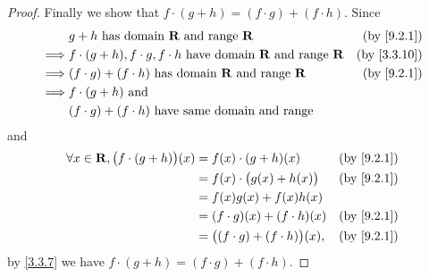 \begin{proof}
  Finally we show that \(f \cdot (g + h) = (f \cdot g) + (f \cdot h)\).
  Since
  \begin{align*}
             & g + h \text{ has domain } \R \text{ and range } \R                                   & \text{(by \cref{9.2.1})}  \\
    \implies & f \cdot (g + h), f \cdot g, f \cdot h  \text{ have domain } \R \text{ and range } \R & \text{(by \cref{3.3.10})} \\
    \implies & (f \cdot g) + (f \cdot h)  \text{ has domain } \R \text{ and range } \R              & \text{(by \cref{9.2.1})}  \\
    \implies & f \cdot (g + h) \text{ and }                                                                                     \\
             & (f \cdot g) + (f \cdot h) \text{ have same domain and range}
  \end{align*}
  and
  \begin{align*}
    \forall x \in \R, \big(f \cdot (g + h)\big)(x) & = f(x) \cdot (g + h)(x)                   & \text{(by \cref{9.2.1})} \\
                                                   & = f(x) \cdot \big(g(x) + h(x)\big)        & \text{(by \cref{9.2.1})} \\
                                                   & = f(x)g(x) + f(x)h(x)                                                \\
                                                   & = (f \cdot g)(x) + (f \cdot h)(x)         & \text{(by \cref{9.2.1})} \\
                                                   & = \big((f \cdot g) + (f \cdot h)\big)(x), & \text{(by \cref{9.2.1})}
  \end{align*}
  by \cref{3.3.7} we have \(f \cdot (g + h) = (f \cdot g) + (f \cdot h)\).
\end{proof}